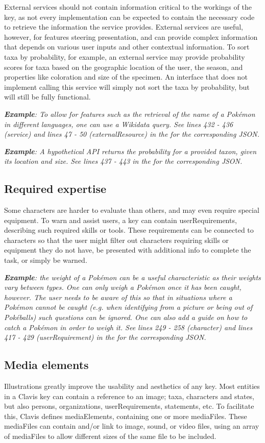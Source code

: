 \documentclass[10pt,letterpaper]{article}
\begin{document}
External services should not contain information critical to the workings of the key, as not every implementation can be expected to contain the necessary code to retrieve the information the service provides. External services are useful, however, for features steering presentation, and can provide complex information that depends on various user inputs and other contextual information. To sort taxa by probability, for example, an external service may provide probability scores for taxa based on the geographic location of the user, the season, and properties like coloration and size of the specimen. An interface that does not implement calling this service will simply not sort the taxa by probability, but will still be fully functional.

\textit{\textbf{Example}: To allow for features such as the retrieval of the name of a Pokémon in different languages, one can use a Wikidata query. See lines 432 - 436 (service) and lines 47 - 50 (externalResource) in the  for the corresponding JSON.}

\textit{\textbf{Example}: A hypothetical API returns the probability for a provided taxon, given its location and size. See lines 437 - 443 in the  for the corresponding JSON.}
\subsection*{
Required expertise
}
Some characters are harder to evaluate than others, and may even require special equipment. To warn and assist users, a key can contain userRequirements, describing such required skills or tools. These requirements can be connected to characters so that the user might filter out characters requiring skills or equipment they do not have, be presented with additional info to complete the task, or simply be warned.

\textit{\textbf{Example}: the weight of a Pokémon can be a useful characteristic as their weights vary between types. One can only weigh a Pokémon once it has been caught, however. The user needs to be aware of this so that in situations where a Pokémon cannot be caught (e.g. when identifying from a picture or being out of Pokéballs) such questions can be ignored. One can also add a guide on how to catch a Pokémon in order to weigh it. See lines 249 - 258 (character) and lines 417 - 429 (userRequirement) in the  for the corresponding JSON.}

\subsection*{
Media elements
}
Illustrations greatly improve the usability and aesthetics of any key. Most entities in a Clavis key can contain a reference to an image; taxa, characters and states, but also persons, organizations, userRequirements, statements, etc. To facilitate this, Clavis defines mediaElements, containing one or more mediaFiles. These mediaFiles can contain and/or link to image, sound, or video files, using an array of mediaFiles to allow different sizes of the same file to be included.
\end{document}
